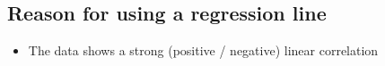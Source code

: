\subsection{Reason for using a regression line}
\begin{itemize}
	\item The data shows a strong (positive / negative) linear correlation
\end{itemize}
